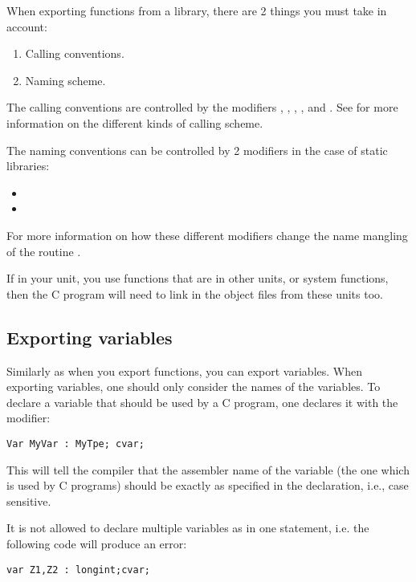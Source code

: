 When exporting functions from a library, there are 2 things you must take in
account:

\begin{enumerate}
\item Calling conventions.
\item Naming scheme.
\end{enumerate}
The calling conventions are controlled by the modifiers ,
, , ,  and
. See  for more information on the
different kinds of calling scheme.

The naming conventions can be controlled by 2 modifiers in the case
of static libraries:
\begin{itemize}
\item {}
\item {}
\end{itemize}

For more information on how these different modifiers change the name
mangling of the routine .


\begin{remark}
If in your unit, you use functions that are in other units, or system 
functions, then the C program will need to link in the object files
from these units too.
\end{remark}

\subsection{Exporting variables}
Similarly as when you export functions, you can export variables.
When exporting variables, one should only consider the names of the
variables. To declare a variable that should be used by a C program,
one declares it with the  modifier:
\begin{verbatim}
Var MyVar : MyTpe; cvar;
\end{verbatim}
This will tell the compiler that the assembler name of the variable (the one
which is used by C programs) should be exactly as specified in the
declaration, i.e., case sensitive.

It is not allowed to declare multiple variables as  in one
statement, i.e. the following code will produce an error:
\begin{verbatim}
var Z1,Z2 : longint;cvar;
\end{verbatim}

